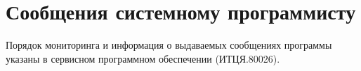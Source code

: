 \newpage
\section{Сообщения системному программисту}
Порядок мониторинга и информация о выдаваемых сообщениях  программы указаны в сервисном программном обеспечении (ИТЦЯ.80026).